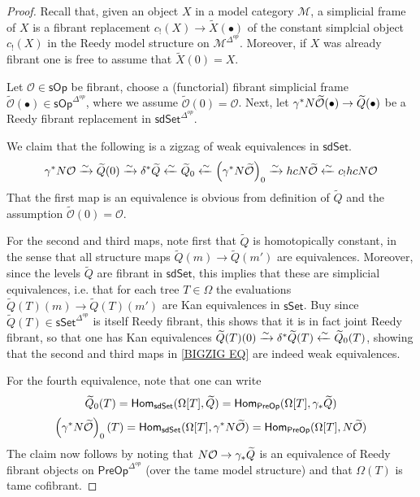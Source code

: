 \documentclass[a4paper,10pt
]{article}%
\renewcommand{\1}{\ensuremath{\mathbb{id}}}
\begin{document}
\begin{proof}
	Recall that, given an object $X$ in a model category $\mathcal{M}$, a simplicial frame of $X$ is a fibrant replacement
	$c_!(X) \to \widetilde{X}(\bullet)$ of the constant 
	simplcial object $c_!(X)$ in the Reedy model structure on $\mathcal{M}^{\Delta^{op}}$.
	Moreover, if $X$ was already fibrant one is free to assume that $\widetilde{X}(0) = X$.
	
	Let $\mathcal{O} \in \mathsf{sOp}$ be fibrant, 
	choose a (functorial) fibrant simplicial frame
	$\widetilde{\mathcal{O}}(\bullet) \in \mathsf{sOp}^{\Delta^{op}}$, where we assume $\widetilde{\mathcal{O}} (0) = \mathcal{O}$.
	Next, let 
	$\gamma^{\**} N \widetilde{\mathcal{O}}(\bullet) 
	\to \widetilde{Q}(\bullet)$
	be a Reedy fibrant replacement in  
	$\mathsf{sdSet}^{\Delta^{op}}$.
	
	We claim that the following is a zigzag of weak equivalences in $\mathsf{sdSet}$.
\begin{equation}\label{BIGZIG EQ}
	\gamma^{\**} N \mathcal{O} \xrightarrow{\sim}
	\widetilde{Q}(0) \xrightarrow{\sim}
	\delta^{\**} \widetilde{Q} \xleftarrow{\sim}
	\widetilde{Q}_0 \xleftarrow{\sim}
	\left(\gamma^{\**} N \widetilde{\mathcal{O}}\right)_0
	\xrightarrow{\sim}
	hcN \widetilde{\mathcal{O}} \xleftarrow{\sim}
	c_{!} hcN \mathcal{O}
\end{equation}
That the first map is an equivalence is obvious from definition of $\widetilde{Q}$ and the assumption $\widetilde{\mathcal{O}}(0) = \mathcal{O}$.

For the second and third maps, note first that $\widetilde{Q}$ is homotopically constant, in the sense that all structure maps $\widetilde{Q}(m) \to \widetilde{Q}(m')$
are equivalences.
Moreover, since the levels $\widetilde{Q}$ are fibrant in 
$\mathsf{sdSet}$, this implies that these are simplicial equivalences, i.e. that for each tree $T \in \Omega$
the evaluations 
$\widetilde{Q}(T)(m) \to \widetilde{Q}(T)(m')$
are Kan equivalences in $\mathsf{sSet}$.
Buy since $\widetilde{Q}(T) \in \mathsf{sSet}^{\Delta^{op}}$ is itself Reedy fibrant, this shows that it is in fact joint Reedy fibrant, so that one has Kan equivalences 
$\widetilde{Q}(T)(0) \xrightarrow{\sim}
\delta^{\**} \widetilde{Q}(T) \xleftarrow{\sim}
\widetilde{Q}_0(T)$, showing that the second and third maps in \eqref{BIGZIG EQ} are indeed weak equivalences.

For the fourth equivalence, note that one can write
\[\widetilde{Q}_0(T) = 
\mathsf{Hom}_{\mathsf{sdSet}}(\Omega[T],\widetilde{Q})=
\mathsf{Hom}_{\mathsf{PreOp}}(\Omega[T],\gamma_{\**}\widetilde{Q})\]
\[
\left(\gamma^{\**} N \widetilde{\mathcal{O}}\right)_0(T) = 
\mathsf{Hom}_{\mathsf{sdSet}}(\Omega[T],\gamma^{\**} N \widetilde{\mathcal{O}})=
\mathsf{Hom}_{\mathsf{PreOp}}(\Omega[T], N \widetilde{\mathcal{O}})
\]
The claim now follows by noting that
$N \mathcal{O} \to \gamma_{\**} \widetilde{Q}$
is an equivalence of Reedy fibrant objects on 
$\mathsf{PreOp}^{\Delta^{op}}$ (over the tame model structure) and that $\Omega(T)$ is tame cofibrant. 


\end{proof}
\end{document}
